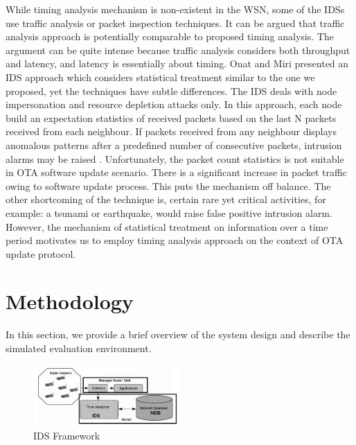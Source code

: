 \documentclass[conference]{IEEEtran}
\begin{document}
While timing analysis mechanism is non-existent in the WSN, some of the IDSs use traffic analysis or packet inspection  techniques.
It can be argued that traffic analysis approach is potentially comparable to proposed timing analysis.
The argument can be quite intense because traffic analysis considers both throughput and latency, and latency is essentially about timing.
Onat and Miri presented an IDS approach which considers statistical treatment similar to the one we proposed, yet the techniques have subtle differences.
The IDS deals with node impersonation and resource depletion attacks only.
In this approach, each node build an expectation statistics of received packets based on the last N packets received from each neighbour.
If packets received from any neighbour displays anomalous patterns after a predefined number of consecutive packets, intrusion alarms may be raised \cite{1512911}.
Unfortunately, the  packet count statistics is not suitable in OTA software update scenario.
There is a significant increase in packet traffic owing to software update process. 
This puts the mechanism off balance.
The other shortcoming of the technique is, certain rare yet critical activities, for example: a tsunami or earthquake, would raise false positive intrusion alarm.
However, the mechanism of statistical treatment on information over a time period motivates us to employ timing analysis approach on the context of OTA update protocol.

\section{Methodology}
\label{sec:meth}

In this section, we provide a brief overview of the system design and describe the simulated evaluation environment. 
\begin{figure}[btp]
    \centering
    \includegraphics[width=0.5\textwidth]{IDS_fw}	
    \caption{IDS Framework}
    \label{fig:ids_fw}
\end{figure}
\end{document}

